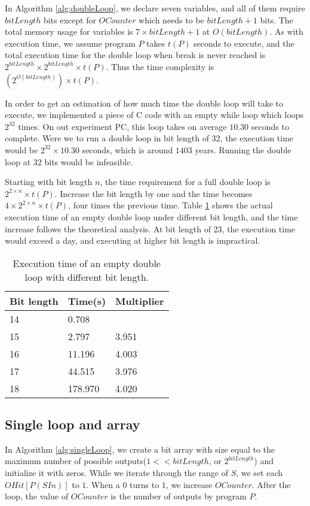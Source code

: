 In Algorithm \ref{alg:doubleLoop}, we declare seven variables, and all of them require $bitLength$ bits except for $OCounter$ which needs to be $bitLength + 1$ bits. The total memory usage for variables is $7 \times bitLength + 1$ at $O(bitLength)$. As with execution time, we assume program $P$ takes $t(P)$ seconds to execute, and the total execution time for the double loop when break is never reached is $2^{bitLength} \times 2^{bitLength} \times t(P)$. Thus the time complexity is $(2^{O(bitLength)}) \times t(P)$.

In order to get an estimation of how much time the double loop will take to execute, we implemented a piece of C code with an empty while loop which loops $2^{32}$ times. On out experiment PC, this loop takes on average $10.30$ seconds to complete. Were we to run a double loop in bit length of 32, the execution time would be $2^{32} \times 10.30$ seconds, which is around $1403$ years. Running the double loop at 32 bits would be infeasible.

Starting with bit length $n$, the time requirement for a full double loop is $2^{2 \times n} \times t(P)$. Increase the bit length by one and the time becomes $4 \times 2^{2 \times n} \times t(P)$, four times the previous time. Table \ref{tab:gccRun} shows the actual execution time of an empty double loop under different bit length, and the time increase follows the theoretical analysis. At bit length of 23, the execution time would exceed a day, and executing at higher bit length is impractical.

\begin{table}
\centering
\begin{tabular}{|l|l|l|}
\hline Bit length & Time(s) & Multiplier\\
\hline 14 & 0.708 & 	\\
\hline 15 & 2.797 & 3.951	\\
\hline 16 & 11.196	& 4.003	\\
\hline 17 & 44.515	& 3.976	\\
\hline 18 & 178.970	& 4.020	\\
\hline 
\end{tabular}
\caption{Execution time of an empty double loop with different bit length.}
\label{tab:gccRun}
\end{table}

\subsection{Single loop and array}
In Algorithm \ref{alg:singleLoop}, we create a bit array with size equal to the maximum number of possible outputs($1 << bitLength$, or $2^{bitLength}$) and initialize it with zeros. While we iterate through the range of $S$, we set each $OHit[P(SIn)]$ to $1$. When a $0$ turns to $1$, we increase $OCounter$. After the loop, the value of $OCounter$ is the number of outputs by program $P$. 

